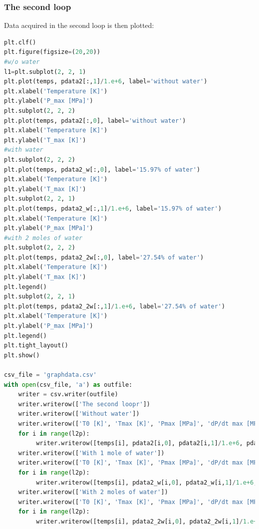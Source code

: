 \documentclass[a4paper]{article}
\begin{document}
\subsubsection{The second loop}
Data acquired in the second loop is then plotted:
\begin{lstlisting}[language=python]
plt.clf()
plt.figure(figsize=(20,20))
#w/o water
l1=plt.subplot(2, 2, 1)
plt.plot(temps, pdata2[:,1]/1.e+6, label='without water')
plt.xlabel('Temperature [K]')
plt.ylabel('P_max [MPa]')
plt.subplot(2, 2, 2)
plt.plot(temps, pdata2[:,0], label='without water')
plt.xlabel('Temperature [K]')
plt.ylabel('T_max [K]')
#with water
plt.subplot(2, 2, 2)
plt.plot(temps, pdata2_w[:,0], label='15.97% of water')
plt.xlabel('Temperature [K]')
plt.ylabel('T_max [K]')
plt.subplot(2, 2, 1)
plt.plot(temps, pdata2_w[:,1]/1.e+6, label='15.97% of water')
plt.xlabel('Temperature [K]')
plt.ylabel('P_max [MPa]')
#with 2 moles of water
plt.subplot(2, 2, 2)
plt.plot(temps, pdata2_2w[:,0], label='27.54% of water')
plt.xlabel('Temperature [K]')
plt.ylabel('T_max [K]')
plt.legend()
plt.subplot(2, 2, 1)
plt.plot(temps, pdata2_2w[:,1]/1.e+6, label='27.54% of water')
plt.xlabel('Temperature [K]')
plt.ylabel('P_max [MPa]')
plt.legend()
plt.tight_layout()
plt.show()

csv_file = 'graphdata.csv'
with open(csv_file, 'a') as outfile:
    writer = csv.writer(outfile)
    writer.writerow(['The second loopr'])
    writer.writerow(['Without water'])
    writer.writerow(['T0 [K]', 'Tmax [K]', 'Pmax [MPa]', 'dP/dt max [MPa/s]'])
    for i in range(l2p):
         writer.writerow([temps[i], pdata2[i,0], pdata2[i,1]/1.e+6, pdata2[i,2]])
    writer.writerow(['With 1 mole of water'])
    writer.writerow(['T0 [K]', 'Tmax [K]', 'Pmax [MPa]', 'dP/dt max [MPa/s]'])
    for i in range(l2p):
         writer.writerow([temps[i], pdata2_w[i,0], pdata2_w[i,1]/1.e+6, pdata2_w[i,2]])
    writer.writerow(['With 2 moles of water'])
    writer.writerow(['T0 [K]', 'Tmax [K]', 'Pmax [MPa]', 'dP/dt max [MPa/s]'])
    for i in range(l2p):
         writer.writerow([temps[i], pdata2_2w[i,0], pdata2_2w[i,1]/1.e+6, pdata2_2w[i,2]])
\end{lstlisting}
\end{document}
